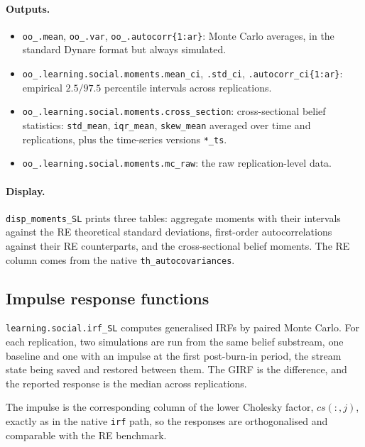 \documentclass[11pt,a4paper]{article}
\newcommand{\field}[1]{\texttt{#1}}
\begin{document}
\paragraph{Outputs.}
\begin{itemize}[leftmargin=2em]
\item \field{oo\_.mean}, \field{oo\_.var},
      \field{oo\_.autocorr\{1:ar\}}: Monte Carlo averages, in the standard
      Dynare format but always simulated.
\item \field{oo\_.learning.social.moments.mean\_ci}, \field{.std\_ci},
      \field{.autocorr\_ci\{1:ar\}}: empirical $2.5/97.5$ percentile
      intervals across replications.
\item \field{oo\_.learning.social.moments.cross\_section}: cross-sectional
      belief statistics: \field{std\_mean}, \field{iqr\_mean},
      \field{skew\_mean} averaged over time and replications, plus the
      time-series versions \field{*\_ts}.
\item \field{oo\_.learning.social.moments.mc\_raw}: the raw replication-level
      data.
\end{itemize}

\paragraph{Display.} \texttt{disp\_moments\_SL} prints three tables: aggregate
moments with their intervals against the RE theoretical standard deviations,
first-order autocorrelations against their RE counterparts, and the
cross-sectional belief moments. The RE column comes from the native
\texttt{th\_autocovariances}.


\subsection{Impulse response functions}
\label{sec:simulation:irfs}

\texttt{learning.social.irf\_SL} computes generalised IRFs by paired Monte
Carlo. For each replication, two simulations are run from the same belief
substream, one baseline and one with an impulse at the first post-burn-in
period, the stream state being saved and restored between them. The GIRF is the
difference, and the reported response is the median across replications.

The impulse is the corresponding column of the lower Cholesky factor,
$cs(:,j)$, exactly as in the native \texttt{irf} path, so the responses are
orthogonalised and comparable with the RE benchmark.
\end{document}
